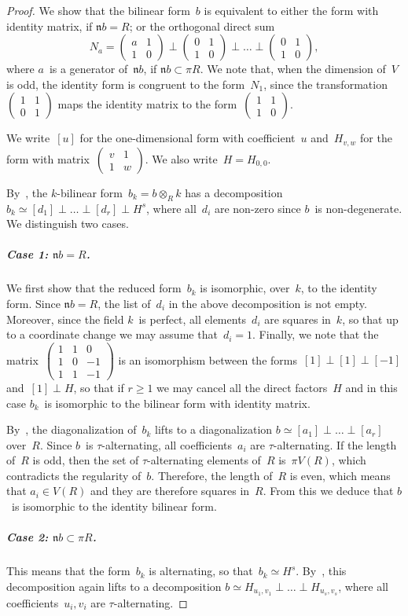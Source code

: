 \documentclass{article}%
\let\fr\mathfrak
\def\mat#1{\begin{pmatrix}#1\end{pmatrix}}
\begin{document}
\begin{proof}
We show that the bilinear form~$b$ is equivalent to either the form with
identity matrix, if $\fr n b = R$; or the orthogonal direct sum
\[ N_a = \mat{a & 1\\1&0} ⟂ \mat{0 & 1\\1&0} ⟂ … ⟂ \mat {0 & 1\\ 1 & 0}, \]
where $a$~is a generator of~$\fr n b$, if $\fr n b ⊂ π R$.
We note that, when the dimension of~$V$ is odd, the identity form is
congruent to the form~$N_1$, since the transformation~$\mat{1&1\\0&1}$
maps the identity matrix to the form~$\mat{1&1\\1&0}$.

We write~$[u]$ for the one-dimensional form with coefficient~$u$
and~$H_{v, w}$ for the form with matrix~$\mat{v&1\\1&w}$.
We also write~$H = H_{0,0}$.

By~\cite[§2]{milnor2}, the $k$-bilinear form~$b_k = b ⊗_R k$ has a
decomposition~$b_k ≃ [d_1] ⟂ … ⟂ [d_r] ⟂ H^s$, where all~$d_i$ are
non-zero since $b$~is non-degenerate. We distinguish two cases.

\subparagraph{Case 1: $\fr n b = R$.}
We first show that the reduced form~$b_k$ is isomorphic, over~$k$, to the
identity form. Since $\fr n b = R$, the list of~$d_i$ in the above
decomposition is not empty. Moreover, since the field $k$~is perfect, all
elements~$d_i$ are squares in~$k$, so that up to a coordinate change we
may assume that~$d_i = 1$. Finally, we note that the
matrix~$\mat{1&1&0\\1&0&-1\\1&1&-1}$ is an isomorphism between the
forms~$[1] ⟂ [1] ⟂ [-1]$ and~$[1] ⟂ H$, so that if $r ≥ 1$ we may cancel
all the direct factors~$H$ and in this case $b_k$~is isomorphic to the
bilinear form with identity matrix.

By~\cite[Corollary 3.4]{baeza1978quadratic},
the diagonalization of~$b_k$ lifts to a diagonalization
$b ≃ [a_1] ⟂ … ⟂ [a_r]$ over~$R$.
Since $b$~is $τ$-alternating, all coefficients~$a_i$ are $τ$-alternating.
If the length of~$R$ is odd, then the set of $τ$-alternating elements of~$R$
is~$π V(R)$, which contradicts the regularity of~$b$.
Therefore, the length of~$R$ is even, which means that $a_i ∈ V(R)$ and they are
therefore squares in~$R$.
From this we deduce that $b$~is isomorphic to the identity bilinear form.

\subparagraph{Case 2: $\fr n b ⊂ π R$.}
This means that the form~$b_k$ is alternating, so that~$b_k ≃ H^s$.
By~\cite[Corollary 3.4]{baeza1978quadratic}, this decomposition again lifts to a
decomposition $b ≃ H_{u_1, v_1} ⟂ … ⟂ H_{u_s, v_s}$, where all
coefficients~$u_i, v_i$ are $τ$-alternating.


\end{proof}
\end{document}
